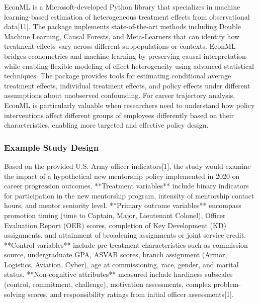 \documentclass[main.tex]{subfiles}
\begin{document}
EconML is a Microsoft-developed Python library that specializes in machine learning-based estimation of heterogeneous treatment effects from observational data[11]. The package implements state-of-the-art methods including Double Machine Learning, Causal Forests, and Meta-Learners that can identify how treatment effects vary across different subpopulations or contexts. EconML bridges econometrics and machine learning by preserving causal interpretation while enabling flexible modeling of effect heterogeneity using advanced statistical techniques. The package provides tools for estimating conditional average treatment effects, individual treatment effects, and policy effects under different assumptions about unobserved confounding. For career trajectory analysis, EconML is particularly valuable when researchers need to understand how policy interventions affect different groups of employees differently based on their characteristics, enabling more targeted and effective policy design.

\subsubsection{Example Study Design}


Based on the provided U.S. Army officer indicators[1], the study would examine the impact of a hypothetical new mentorship policy implemented in 2020 on career progression outcomes. **Treatment variables** include binary indicators for participation in the new mentorship program, intensity of mentorship contact hours, and mentor seniority level. **Primary outcome variables** encompass promotion timing (time to Captain, Major, Lieutenant Colonel), Officer Evaluation Report (OER) scores, completion of Key Development (KD) assignments, and attainment of broadening assignments or joint service credit. **Control variables** include pre-treatment characteristics such as commission source, undergraduate GPA, ASVAB scores, branch assignment (Armor, Logistics, Aviation, Cyber), age at commissioning, race, gender, and marital status. **Non-cognitive attributes** measured include hardiness subscales (control, commitment, challenge), motivation assessments, complex problem-solving scores, and responsibility ratings from initial officer assessments[1].

\end{document}
